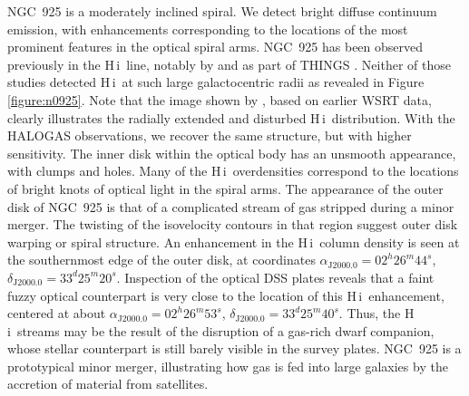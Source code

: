 \documentclass[oldversion]{aa}
\newcommand{\HI}{{\sc H\,i}}
\begin{document}
NGC~925 is a moderately inclined spiral. We detect bright diffuse continuum emission, with enhancements corresponding to the locations of the most prominent features in the optical spiral arms. NGC~925 has been observed previously in the \HI\ line, notably by \citet{pisano_etal_1998} and as part of THINGS \citep[The \HI\ Nearby Galaxy Survey;][]{walter_etal_2008}. Neither of those studies detected \HI\ at such large galactocentric radii as revealed in Figure \ref{figure:n0925}. Note that the image shown by \citet{sancisi_etal_2008}, based on earlier WSRT data, clearly illustrates the radially extended and disturbed \HI\ distribution. With the HALOGAS observations, we recover the same structure, but with higher sensitivity. The inner disk within the optical body has an unsmooth appearance, with clumps and holes. Many of the \HI\ overdensities correspond to the locations of bright knots of optical light in the spiral arms. The appearance of the outer disk of NGC~925 is that of a complicated stream of gas stripped during a minor merger. The twisting of the isovelocity contours in that region suggest outer disk warping or spiral structure. An enhancement in the \HI\ column density is seen at the southernmost edge of the outer disk, at coordinates $\alpha_{\mathrm{J2000.0}}=02^{h}26^{m}44^{s}$, $\delta_{\mathrm{J2000.0}}=33^{d}25^{m}20^{s}$. Inspection of the optical DSS plates reveals that a faint fuzzy optical counterpart is very close to the location of this \HI\ enhancement, centered at about $\alpha_{\mathrm{J2000.0}}=02^{h}26^{m}53^{s}$, $\delta_{\mathrm{J2000.0}}=33^{d}25^{m}40^{s}$. Thus, the \HI\ streams may be the result of the disruption of a gas-rich dwarf companion, whose stellar counterpart is still barely visible in the survey plates. NGC~925 is a prototypical minor merger, illustrating how gas is fed into large galaxies by the accretion of material from satellites.
\end{document}
